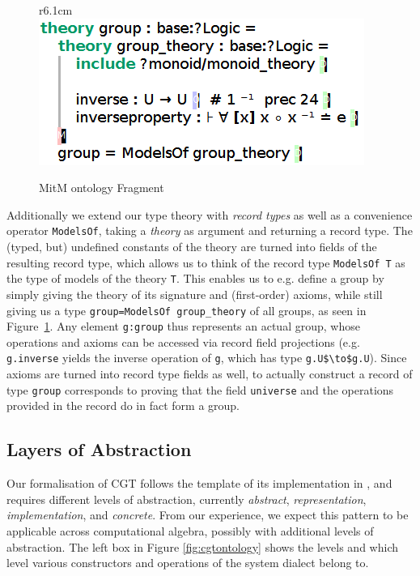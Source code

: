 \begin{figure}r{6.1cm}\vspace*{-2.5em}
  \includegraphics[width=.5\textwidth]{mitm1}\vspace*{-1em}
  \caption{MitM ontology Fragment}\label{fig:mitm1}\vspace*{-1em}
\end{figure}
 Additionally we extend our type theory with \emph{record types} as well as a convenience operator \lstinline|ModelsOf|, taking a \emph{theory} as argument and returning a record type. The (typed, but) undefined constants of the theory are turned into fields of the resulting record type, which allows us to think of the record type \lstinline|ModelsOf T| as the type of models of the theory \lstinline|T|. This enables us to e.g. define a group by simply giving the theory of its signature and (first-order) axioms, while still giving us a type \lstinline|group=ModelsOf group_theory| of all groups, as seen in Figure~\ref{fig:mitm1}. Any element \lstinline|g:group| thus represents an actual group, whose operations and axioms can be accessed via record field projections (e.g. \lstinline|g.inverse| yields the inverse operation of \lstinline|g|, which has type \lstinline[mathescape]|g.U$\to$g.U|). Since axioms are turned into record type fields as well, to actually construct a record of type \lstinline|group| corresponds to proving that the field \lstinline|universe| and the operations provided in the record do in fact form a group.


\subsection{Layers of Abstraction}

Our formalisation of CGT follows the template of its implementation in \GAP, and requires
different levels of abstraction, currently \emph{abstract}, \emph{representation},
\emph{implementation}, and \emph{concrete}.  From our experience, we expect this pattern
to be applicable across computational algebra, possibly with additional levels of
abstraction. The left box in Figure \ref{fig:cgtontology} shows the levels and which level
various constructors and operations of the \GAP system dialect belong to.

